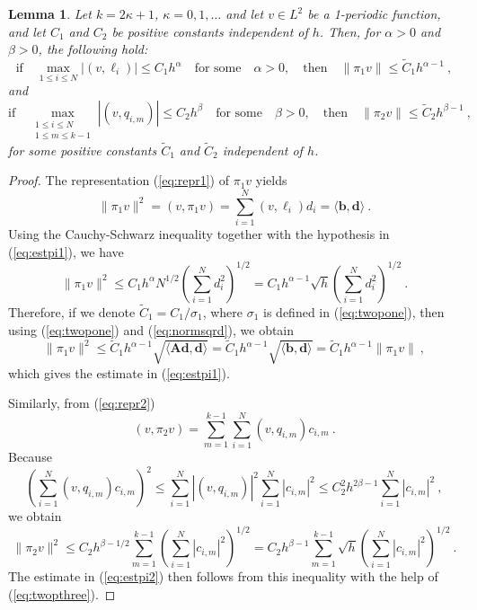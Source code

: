 \documentclass{amsart}
\newcommand{\bd}{\mathbf{d}}
\newcommand{\bb}{\mathbf{b}}
\newcommand{\bA}{\mathbf{A}}
\newtheorem{lemma}{Lemma}[section]
\begin{document}
\begin{lemma}\label{lem:estimatepis}
Let $k=2\kappa+1$, $\kappa=0,1,\dots$ and let $v\in L^2$ be a 1-periodic function, and let $C_1$ and $C_2$  be positive constants independent of $h$. Then, for $\alpha>0$ and $\beta>0$, the following hold: 
\begin{equation}\label{eq:estpi1}
\text{if}\quad \max_{1\leq i\leq N}|(v,\ell_i)|\leq C_1 h^\alpha \quad \text{for some} \quad \alpha>0,\quad \text{then} \quad \|\pi_1 v\|\leq \widetilde{C}_1 h^{\alpha-1} \ ,
\end{equation}
and
\begin{equation}\label{eq:estpi2}
\text{if}\quad \max_{\substack{1\leq i\leq N\\1\leq m\leq k-1}}|(v,q_{i,m})|\leq C_2 h^\beta \quad \text{for some} \quad \beta>0,\quad \text{then} \quad \|\pi_2 v\|\leq \widetilde{C}_2 h^{\beta-1} \ ,
\end{equation}
for some positive constants $\widetilde{C}_1$ and $\widetilde{C}_2$ independent of $h$.
\end{lemma}
\begin{proof}
The representation (\ref{eq:repr1}) of $\pi_1 v$  yields
\begin{equation}\label{eq:normsqrd}
\|\pi_1v\|^2=(v,\pi_1 v)=\sum_{i=1}^N (v,\ell_i) d_i=\langle \bb,\bd\rangle\ .
\end{equation} 
Using the Cauchy-Schwarz inequality together with the hypothesis in (\ref{eq:estpi1}), we have
$$\|\pi_1 v\|^2\leq C_1 h^{\alpha}N^{1/2}\left(\sum_{i=1}^N d_i^2 \right)^{1/2}=C_1 h^{\alpha-1}\sqrt{h}\left(\sum_{i=1}^N d_i^2 \right)^{1/2}\ .$$
Therefore, if we denote $\widetilde{C}_1=C_1/\sigma_1$, where $\sigma_1$ is defined in (\ref{eq:twopone}), then using (\ref{eq:twopone}) and (\ref{eq:normsqrd}), we obtain
$$\|\pi_1 v\|^2\leq \widetilde{C}_1 h^{\alpha-1} \sqrt{\langle \bA\bd,\bd\rangle}=\widetilde{C}_1 h^{\alpha-1} \sqrt{\langle \bb,\bd\rangle}= \widetilde{C}_1 h^{\alpha-1} \|\pi_1 v\|\ ,$$
which gives the estimate in (\ref{eq:estpi1}).

Similarly, from (\ref{eq:repr2})
$$(v,\pi_2 v)=\sum_{m=1}^{k-1}\sum_{i=1}^N (v,q_{i,m})c_{i,m}\ .$$
Because
$$\left(\sum_{i=1}^N (v,q_{i,m})c_{i,m} \right)^2\leq \sum_{i=1}^N|(v,q_{i,m})|^2\sum_{i=1}^N|c_{i,m}|^2\leq C_2^2 h^{2\beta-1}\sum_{i=1}^N|c_{i,m}|^2\ ,$$
we obtain
$$\|\pi_2 v\|^2\leq C_2 h^{\beta-1/2}\sum_{m=1}^{k-1}\left(\sum_{i=1}^N|c_{i,m}|^2 \right)^{1/2}=C_2h^{\beta-1}\sum_{m=1}^{k-1}\sqrt{h}\left(\sum_{i=1}^N|c_{i,m}|^2 \right)^{1/2}\ .$$
The estimate in (\ref{eq:estpi2}) then follows from this inequality with the help of (\ref{eq:twopthree}).
\end{proof}
\end{document}
